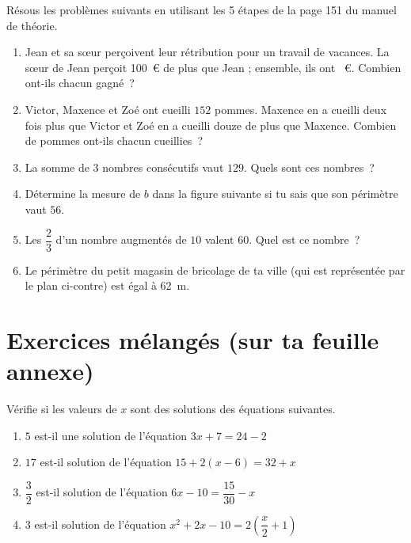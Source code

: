 \documentclass[../math2.tex]{subfiles}
\begin{document}
\begin{exercise}
  Résous les problèmes suivants en utilisant les 5 étapes de la page 151 du manuel de théorie.
  \begin{enumerate}[itemsep=10cm]
    \item
          Jean et sa s\oe{}ur perçoivent leur rétribution pour un travail de
          vacances. La s\oe{}ur de Jean perçoit 100~€ de plus que Jean ;
          ensemble, ils ont ~€. Combien ont-ils chacun gagné~?
    \item
          Victor, Maxence et Zoé ont cueilli $152$ pommes. Maxence en a
          cueilli deux fois plus que Victor et Zoé en a cueilli douze de plus
          que Maxence. Combien de pommes ont-ils chacun cueillies~?
    \item
          La somme de $3$ nombres consécutifs vaut $129$. Quels sont ces
          nombres~?
    \item
          Détermine la mesure de $b$ dans la figure suivante si tu sais que son
          périmètre vaut $56$.
          \begin{center}
            
          \end{center}
    \item
          Les $\dfrac{2}{3}$ d'un nombre augmentés de $10$ valent $60$.
          Quel est ce nombre~?
    \item
          Le périmètre du petit magasin de bricolage de ta ville (qui est
          représentée par le plan ci-contre) est égal à \SI{62}{m}.
          \begin{center}
            
          \end{center}
  \end{enumerate}
\end{exercise}

\newpage
\section{Exercices mélangés (sur ta feuille annexe)}
\begin{exercise}
  Vérifie si les valeurs de $x$ sont des solutions des équations
  suivantes.
  \begin{enumerate}
    \item $5$ est-il une solution de l'équation $3x + 7 = 24 - 2$
    \item $17$ est-il solution de l'équation $15 + 2(x - 6) = 32 + x$
    \item $\dfrac{3}{2}$ est-il solution de l'équation
          $6x - 10 = \dfrac{15}{30} - x$
    \item $3$ est-il solution de l'équation
          $x^{2} + 2x - 10 = 2\left( \dfrac{x}{2} + 1 \right)$
  \end{enumerate}
\end{exercise}
\end{document}
